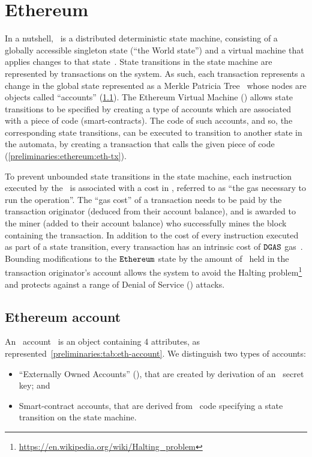 
\section{Ethereum}\label{preliminaries:ethereum}

In a nutshell, \ethereum~is a distributed deterministic state machine, consisting of a globally accessible singleton state (``the World state'') and a virtual machine that applies changes to that state~\cite{mastering-eth}.
State transitions in the state machine are represented by transactions on the system. As such, each transaction represents a change in the global state represented as a Merkle Patricia Tree~\cite{patricia-tree} whose nodes are objects called ``accounts'' (\cref{preliminaries:ethereum:eth-account}). The Ethereum Virtual Machine (\evm) allows state transitions to be specified by creating a type of accounts which are associated with a piece of code (smart-contracts). The code of such accounts, and so, the corresponding state transitions, can be executed to transition to another state in the automata, by creating a transaction that calls the given piece of code (\cref{preliminaries:ethereum:eth-tx}).

To prevent unbounded state transitions in the state machine, each instruction executed by the \evm~is associated with a cost in \wei, referred to as ``the gas necessary to run the operation''. The ``gas cost'' of a transaction needs to be paid by the transaction originator (deduced from their account balance), and is awarded to the miner (added to their account balance) who successfully mines the block containing the transaction.
In addition to the cost of every instruction executed as part of a state transition, every transaction has an intrinsic cost of $\mathtt{DGAS}$ gas~\cite[Appendix G]{ethyellowpaper}. Bounding modifications to the $\texttt{Ethereum}{}$ state by the amount of \wei~held in the transaction originator's account allows the system to avoid the Halting problem\footnote{\url{https://en.wikipedia.org/wiki/Halting\_problem}} and protects against a range of Denial of Service (\dos) attacks.

\subsection{Ethereum account}\label{preliminaries:ethereum:eth-account}

An \ethereum~account~\cite[Section 4.1]{ethyellowpaper} is an object containing 4 attributes, as represented~\cref{preliminaries:tab:eth-account}.
We distinguish two types of accounts:
\begin{itemize}
    \item ``Externally Owned Accounts'' (\eoa), that are created by derivation of an \ecdsa~secret key; and
    \item Smart-contract accounts, that are derived from \evm~code specifying a state transition on the state machine.
\end{itemize}

